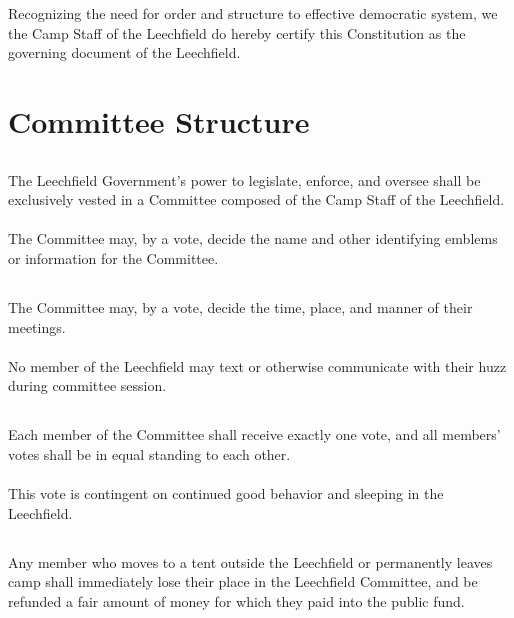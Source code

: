 \documentclass[6pt]{bill}
\begin{document}

	\par Recognizing the need for order and structure to effective democratic system, we the Camp Staff of the Leechfield do hereby certify this Constitution as the governing document of the Leechfield.
	
	\title{}
	
	\section{Committee Structure}{
		\subsection{}{
			The Leechfield Government's power to legislate, enforce, and oversee shall be exclusively vested in a Committee composed of the Camp Staff of the Leechfield.
			\paragraph{}{
				The Committee may, by a vote, decide the name and other identifying emblems or information for the Committee.
			}
		}
		\subsection{}{
			The Committee may, by a vote, decide the time, place, and manner of their meetings.
			\paragraph{}{
				No member of the Leechfield may text or otherwise communicate with their huzz during committee session.
			}
		}
		\subsection{}{
			Each member of the Committee shall receive exactly one vote, and all members' votes shall be in equal standing to each other.
			\paragraph{}{
				This vote is contingent on continued good behavior and sleeping in the Leechfield.
			}
		}
		\subsection{}{
			Any member who moves to a tent outside the Leechfield or permanently leaves camp shall immediately lose their place in the Leechfield Committee, and be refunded a fair amount of money for which they paid into the public fund.
		}
	}
\end{document}
